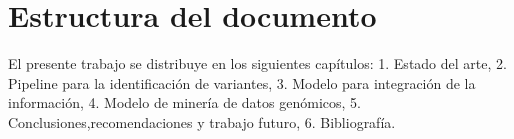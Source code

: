 \section*{Estructura del documento}

El presente trabajo se distribuye en los siguientes capítulos: 1. Estado del arte, 2. Pipeline para la identificación de variantes, 3. Modelo para integración de la información, 4. Modelo de minería de datos genómicos, 5. Conclusiones,recomendaciones y trabajo futuro, 6. Bibliografía.

